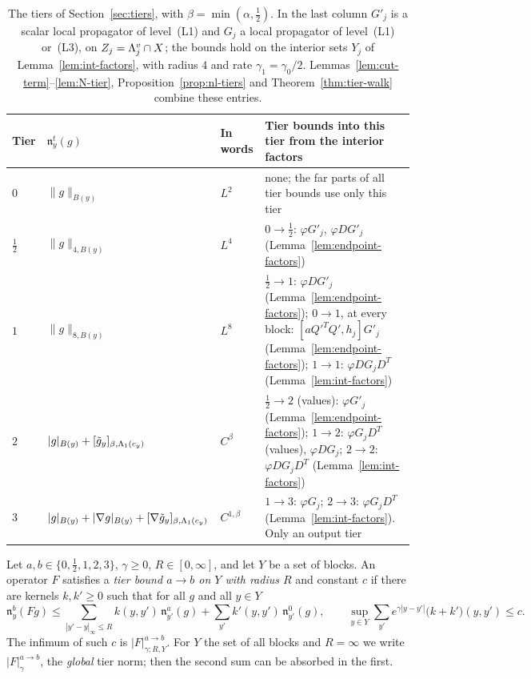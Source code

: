 \begin{table}[tbp]
\centering\small
\begin{tabular}{|p{}|p{}|p{}|p{}|}
\hline
Tier & $\mathfrak n^t_y(g)$ & In words & Tier bounds into this tier from the interior factors\tabularnewline
\hline
$0$ & $\|g\|_{B(y)}$ & $L^2$ & \raggedright none; the far parts of all tier bounds use only this tier\tabularnewline
\hline
$\frac12$ & $\|g\|_{4,B(y)}$ & $L^4$ & \raggedright $0\to\frac12$: $\varphi G'_j$, $\varphi DG'_j$ (Lemma~\ref{lem:endpoint-factors})\tabularnewline
\hline
$1$ & $\|g\|_{8,B(y)}$ & $L^8$ & \raggedright $\frac12\to1$: $\varphi DG'_j$ (Lemma~\ref{lem:endpoint-factors}); $0\to1$, at every block: $[aQ'^TQ',h_j]G'_j$ (Lemma~\ref{lem:endpoint-factors}); $1\to1$: $\varphi DG_jD^T$ (Lemma~\ref{lem:int-factors})\tabularnewline
\hline
$2$ & \raggedright $|g|_{B(y)}+[\tilde g_y]_{\beta,\Lambda_1(c_y)}$ & $C^\beta$ & \raggedright $\frac12\to2$ (values): $\varphi G'_j$ (Lemma~\ref{lem:endpoint-factors}); $1\to2$: $\varphi G_jD^T$ (values), $\varphi DG_j$; $2\to2$: $\varphi DG_jD^T$ (Lemma~\ref{lem:int-factors})\tabularnewline
\hline
$3$ & \raggedright $|g|_{B(y)}+|\nabla g|_{B(y)}+[\nabla\tilde g_y]_{\beta,\Lambda_1(c_y)}$ & $C^{1,\beta}$ & \raggedright $1\to3$: $\varphi G_j$; $2\to3$: $\varphi G_jD^T$ (Lemma~\ref{lem:int-factors}). Only an output tier\tabularnewline
\hline
\end{tabular}
\caption{The tiers of Section~\ref{sec:tiers}, with $\beta=\min(\alpha,\frac12)$. In the last column $G'_j$ is a scalar local propagator of level~(L1) and $G_j$ a local propagator of level~(L1) or~(L3), on $Z_j=\Lambda^v_j\cap X$; the bounds hold on the interior sets $Y_j$ of Lemma~\ref{lem:int-factors}, with radius $4$ and rate $\gamma_1=\gamma_0/2$. Lemmas~\ref{lem:cut-term}--\ref{lem:N-tier}, Proposition~\ref{prop:nl-tiers} and Theorem~\ref{thm:tier-walk} combine these entries.}\label{tab:tiers}
\end{table}

\begin{definition}\label{def:tier}
Let $a,b\in\{0,\frac12,1,2,3\}$, $\gamma\ge0$, $R\in[0,\infty]$, and let $Y$ be a set of blocks. An operator $F$ satisfies a \emph{tier bound $a\to b$ on $Y$ with radius $R$} and constant $c$ if there are kernels $k,k'\ge0$ such that for all $g$ and all $y\in Y$
\[
\mathfrak n^b_y(Fg)\le\sum_{|y'-y|_\infty\le R}k(y,y')\,\mathfrak n^a_{y'}(g)+\sum_{y'}k'(y,y')\,\mathfrak n^0_{y'}(g),\qquad\sup_{y\in Y}\sum_{y'}e^{\gamma|y-y'|}\big(k+k'\big)(y,y')\le c .
\]
The infimum of such $c$ is $|F|^{a\to b}_{\gamma;R,Y}$. For $Y$ the set of all blocks and $R=\infty$ we write $|F|^{a\to b}_\gamma$, the \emph{global} tier norm; then the second sum can be absorbed in the first.
\end{definition}

